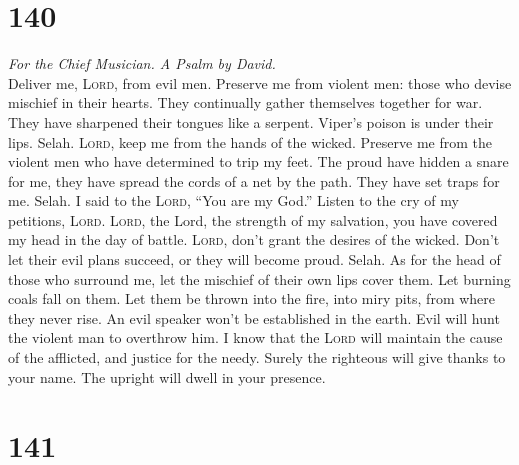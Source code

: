 \hypertarget{section-139}{%
\section{140}\label{section-139}}

\emph{For the Chief Musician. A Psalm by David.}\\
 Deliver me, \textsc{Lord}, from evil men. Preserve me
from violent men:  those who devise mischief in their
hearts. They continually gather themselves together for war.
 They have sharpened their tongues like a serpent. Viper's
poison is under their lips. Selah.  \textsc{Lord}, keep me
from the hands of the wicked. Preserve me from the violent men who have
determined to trip my feet.  The proud have hidden a snare
for me, they have spread the cords of a net by the path. They have set
traps for me. Selah.  I said to the \textsc{Lord}, ``You
are my God.'' Listen to the cry of my petitions, \textsc{Lord}.
 \textsc{Lord}, the Lord, the strength of my salvation,
you have covered my head in the day of battle. 
\textsc{Lord}, don't grant the desires of the wicked. Don't let their
evil plans succeed, or they will become proud. Selah.  As
for the head of those who surround me, let the mischief of their own
lips cover them.  Let burning coals fall on them. Let
them be thrown into the fire, into miry pits, from where they never
rise.  An evil speaker won't be established in the earth.
Evil will hunt the violent man to overthrow him.  I know
that the \textsc{Lord} will maintain the cause of the afflicted, and
justice for the needy.  Surely the righteous will give
thanks to your name. The upright will dwell in your presence.

\hypertarget{section-140}{%
\section{141}\label{section-140}}


